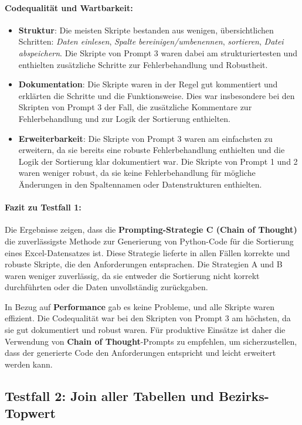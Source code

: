\documentclass[11pt,a4paper]{article}
\begin{document}
\paragraph{Codequalität und Wartbarkeit:}
\begin{itemize}
    \item \textbf{Struktur}: Die meisten Skripte bestanden aus wenigen, übersichtlichen Schritten: \emph{Daten einlesen}, \emph{Spalte bereinigen/umbenennen}, \emph{sortieren}, \emph{Datei abspeichern}. Die Skripte von Prompt 3 waren dabei am strukturiertesten und enthielten zusätzliche Schritte zur Fehlerbehandlung und Robustheit.
    \item \textbf{Dokumentation}: Die Skripte waren in der Regel gut kommentiert und erklärten die Schritte und die Funktionsweise. Dies war insbesondere bei den Skripten von Prompt 3 der Fall, die zusätzliche Kommentare zur Fehlerbehandlung und zur Logik der Sortierung enthielten.
    \item \textbf{Erweiterbarkeit}: Die Skripte von Prompt 3 waren am einfachsten zu erweitern, da sie bereits eine robuste Fehlerbehandlung enthielten und die Logik der Sortierung klar dokumentiert war. Die Skripte von Prompt 1 und 2 waren weniger robust, da sie keine Fehlerbehandlung für mögliche Änderungen in den Spaltennamen oder Datenstrukturen enthielten.
\end{itemize}
    
\paragraph{Fazit zu Testfall 1:}
Die Ergebnisse zeigen, dass die \textbf{Prompting-Strategie C (Chain of Thought)} die zuverlässigste Methode zur Generierung von Python-Code für die Sortierung eines Excel-Datensatzes ist. Diese Strategie lieferte in allen Fällen korrekte und robuste Skripte, die den Anforderungen entsprachen. Die Strategien A und B waren weniger zuverlässig, da sie entweder die Sortierung nicht korrekt durchführten oder die Daten unvollständig zurückgaben.

In Bezug auf \textbf{Performance} gab es keine Probleme, und alle Skripte waren effizient. Die Codequalität war bei den Skripten von Prompt 3 am höchsten, da sie gut dokumentiert und robust waren. Für produktive Einsätze ist daher die Verwendung von \textbf{Chain of Thought}-Prompts zu empfehlen, um sicherzustellen, dass der generierte Code den Anforderungen entspricht und leicht erweitert werden kann.

\subsection{Testfall 2: Join aller Tabellen und Bezirks-Topwert}
\label{subsec:auswertung_testfall2}
\end{document}

